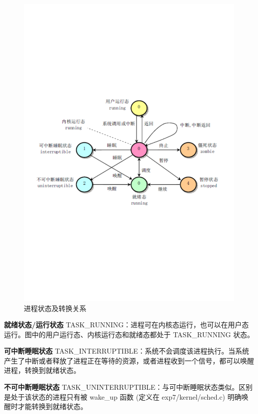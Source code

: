 \begin{figure}[htbp]
    \centering
    \includegraphics[width=\textwidth]{img/进程状态及转换关系.pdf}
    \caption{进程状态及转换关系}
    \label{fig:进程状态及转换关系}
\end{figure}

\textbf{就绪状态/运行状态} TASK\_RUNNING：进程可在内核态运行，也可以在用户态运行。图中的用户运行态、内核运行态和就绪态都处于 TASK\_RUNNING 状态。

\textbf{可中断睡眠状态} TASK\_INTERRUPTIBLE：系统不会调度该进程执行。当系统产生了中断或者释放了进程正在等待的资源，或者进程收到一个信号，都可以唤醒进程，转换到就绪状态。

\textbf{不可中断睡眠状态} TASK\_UNINTERRUPTIBLE：与可中断睡眠状态类似。区别是处于该状态的进程只有被 wake\_up 函数 (定义在 exp7/kernel/sched.c) 明确唤醒时才能转换到就绪状态。

